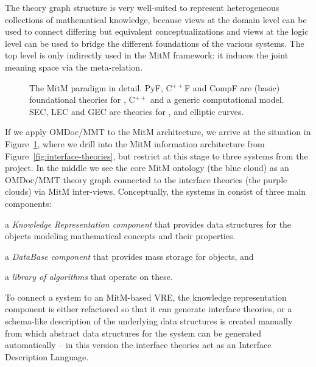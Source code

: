 The theory graph structure is very well-suited to represent heterogeneous collections of
mathematical knowledge, because views at the domain level can be used to connect differing
but equivalent conceptualizations and views at the logic level can be used to bridge the
different foundations of the various systems. The top level is only indirectly used in
the MitM framework: it induces the joint meaning space via the meta-relation.

\begin{figure}[ht]\centering
  
  \caption{The MitM paradigm in detail. PyF, C${}^{++}$F and CompF are (basic) foundational theories for \Python, C${}^{++}$ and a generic computational model. SEC, LEC and GEC are theories for \Sage, \LMFDB and \GAP elliptic curves.}\label{fig:mitm}
\end{figure}
If we apply OMDoc/MMT to the MitM architecture, we arrive at the situation in
Figure~\ref{fig:mitm}, where we drill into the MitM information architecture from
Figure~\ref{fig:interface-theories}, but restrict at this stage to three systems from the \ODK
project. In the middle we see the core MitM ontology (the blue cloud) as an OMDoc/MMT
theory graph connected to the interface theories (the purple clouds) via MitM
inter-views. Conceptually, the systems in \ODK consist of three main components:
\begin{compactenum}[\em i\rm)]
\item a \emph{Knowledge Representation component} that provides data structures for the objects modeling mathematical concepts and their properties.
\item a \emph{DataBase component} that provides mass storage for objects, and 
\item a \emph{library of algorithms} that operate on these.
\end{compactenum}
To connect a system to an MitM-based VRE, the knowledge representation component is either
refactored so that it can generate interface theories, or a schema-like description of the
underlying data structures is created manually from which abstract data structures for the
system can be generated automatically -- in this version the interface theories act as an
Interface Description Language.


